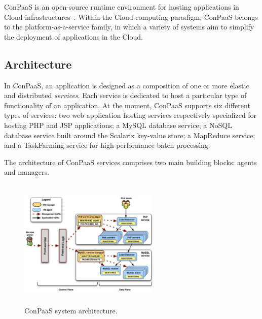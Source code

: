 

ConPaaS is an open-source runtime environment for hosting applications in Cloud infrastructures~\cite{conpaasIC}.
Within the Cloud computing paradigm, ConPaaS belongs to the platform-as-a-service family, 
in which a variety of systems aim to simplify the deployment of applications in the Cloud. 


\subsection*{Architecture}

In ConPaaS, an application is designed as a composition of one or more elastic and distributed \emph{services}. Each service is dedicated to host a particular type of functionality of an application. At the moment, ConPaaS supports six different types of services: two web application hosting services respectively specialized for hosting PHP and JSP applications; a MySQL database service; a NoSQL database service built around the Scalarix key-value store; a MapReduce service; and a TaskFarming service for high-performance batch processing.  

The architecture of ConPaaS services comprises two main building blocks: agents and managers.

\begin{figure}[Ht]
\begin{center}
\includegraphics[width=0.6\textwidth, height=6.2cm]{./images/conpaasSystemArch_2}
\end{center}
\vspace{-5mm}
\caption{ConPaaS system architecture.}
\label{arch}
\end{figure}



